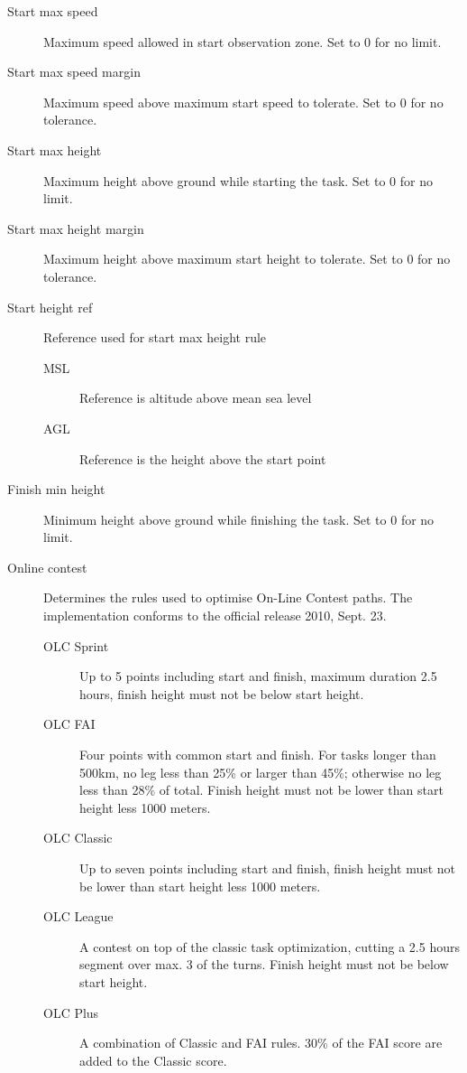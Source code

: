 \begin{description}
\item[Start max speed]  Maximum speed allowed in start observation zone.  Set to 0 for no limit.
\item[Start max speed margin] Maximum speed above maximum start speed to tolerate.  Set to 0 for no tolerance.
\item[Start max height]  Maximum height above ground while starting the task.  Set to 0 for no limit.
\item[Start max height margin]  Maximum height above maximum start height to tolerate.  Set to 0 for no tolerance.
\item[Start height ref]  Reference used for start max height rule
\begin{description}
\item[MSL] Reference is altitude above mean sea level
\item[AGL] Reference is the height above the start point
\end{description}
\item[Finish min height]  Minimum height above ground while finishing the task.  Set to 0 for no limit. 
\item[Online contest] Determines the rules used to optimise On-Line Contest
paths.  The implementation  conforms to the official release 2010, Sept. 23.
\begin{description}
\item[OLC Sprint]  Up to 5 points including start and finish, maximum duration
2.5 hours, finish height must not be below start height.
\item[OLC FAI]  Four points with common start and finish.  For tasks longer than
500km, no leg less than 25\% or larger than 45\%; otherwise no leg less than 28\% of total.  Finish height must 
not be lower than start height less 1000 meters.
\item[OLC Classic]  Up to seven points including start and finish, finish height
must not be lower than start height less 1000 meters.
\item[OLC League]  A contest on top of the classic task optimization, cutting
a 2.5 hours segment over max. 3 of the turns. Finish height must not be below
start height.
\item[OLC Plus]  A combination of Classic and FAI rules. 30\% of the FAI score
are added to the Classic score.
\end{description}
\end{description}


